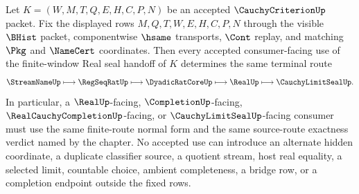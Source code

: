 \begin{corollary}
\label{cor:cauchy-criterion-finite-window-real-seal-handoff-determinacy}
Let $K=(W,M,T,Q,E,H,C,P,N)$ be an accepted $\CauchyCriterionUp$ packet. Fix
the displayed rows $M,Q,T,W,E,H,C,P,N$ through the visible $\BHist$ packet,
componentwise $\hsame$ transports, $\Cont$ replay, and matching $\Pkg$ and
$\NameCert$ coordinates. Then every accepted consumer-facing use of the
finite-window Real seal handoff of $K$ determines the same terminal route
$$
\StreamNameUp
\longmapsto \RegSeqRatUp
\longmapsto \DyadicRatCoreUp
\longmapsto \RealUp
\longmapsto \CauchyLimitSealUp .
$$
In particular, a $\RealUp$-facing, $\CompletionUp$-facing,
$\RealCauchyCompletionUp$-facing, or $\CauchyLimitSealUp$-facing consumer must
use the same finite-route normal form and the same source-route exactness
verdict named by the chapter. No accepted use can introduce an alternate
hidden coordinate, a duplicate classifier source, a quotient stream, host real
equality, a selected limit, countable choice, ambient completeness, a bridge
row, or a completion endpoint outside the fixed rows.
\end{corollary}
